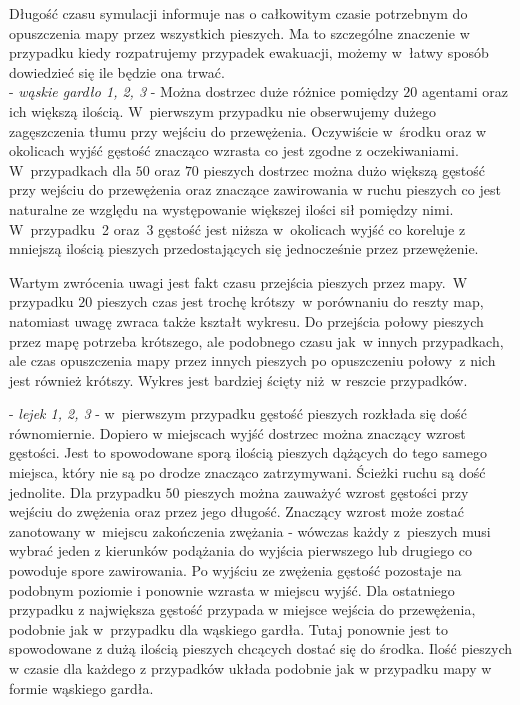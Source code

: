 Długość czasu symulacji informuje nas o całkowitym czasie potrzebnym do opuszczenia mapy przez wszystkich pieszych. Ma to szczególne znaczenie w przypadku kiedy rozpatrujemy przypadek ewakuacji, możemy w~łatwy sposób dowiedzieć się ile będzie ona trwać. \\

- \textit{wąskie gardło 1, 2, 3} - Można dostrzec duże różnice pomiędzy $20$ agentami oraz ich większą ilością. W~pierwszym przypadku nie obserwujemy dużego zagęszczenia tłumu przy wejściu do przewężenia. Oczywiście w~środku oraz w okolicach wyjść gęstość znacząco wzrasta co jest zgodne z oczekiwaniami. W~przypadkach dla $50$ oraz $70$ pieszych dostrzec można dużo większą gęstość przy wejściu do przewężenia oraz znaczące zawirowania w ruchu pieszych co jest naturalne ze względu na występowanie większej ilości sił pomiędzy nimi. W~przypadku~2 oraz~3 gęstość jest niższa w~okolicach wyjść co koreluje z mniejszą ilością pieszych przedostających się jednocześnie przez przewężenie.

Wartym zwrócenia uwagi jest fakt czasu przejścia pieszych przez mapy.~W przypadku $20$ pieszych czas jest trochę krótszy~w porównaniu do reszty map, natomiast uwagę zwraca także kształt wykresu. Do przejścia połowy pieszych przez mapę potrzeba krótszego, ale podobnego czasu jak~w innych przypadkach, ale czas opuszczenia mapy przez innych pieszych po opuszczeniu połowy~z nich jest również krótszy. Wykres jest bardziej ścięty niż~w reszcie przypadków.

- \textit{lejek 1, 2, 3} - w~pierwszym przypadku gęstość pieszych rozkłada się dość równomiernie. Dopiero w miejscach wyjść dostrzec można znaczący wzrost gęstości. Jest to spowodowane sporą ilością pieszych dążących do tego samego miejsca, który nie są po drodze znacząco zatrzymywani. Ścieżki ruchu są dość jednolite. Dla przypadku $50$ pieszych można zauważyć wzrost gęstości przy wejściu do zwężenia oraz przez jego długość. Znaczący wzrost może zostać zanotowany w~miejscu zakończenia zwężania - wówczas każdy z~pieszych musi wybrać jeden z kierunków podążania do wyjścia pierwszego lub drugiego co powoduje spore zawirowania. Po wyjściu ze zwężenia gęstość pozostaje na podobnym poziomie i ponownie wzrasta w miejscu wyjść. Dla ostatniego przypadku z największa gęstość przypada w miejsce wejścia do przewężenia, podobnie jak w~przypadku dla wąskiego gardła. Tutaj ponownie jest to spowodowane z dużą ilością pieszych chcących dostać się do środka. 
Ilość pieszych w czasie dla każdego z przypadków układa podobnie jak w przypadku mapy w formie wąskiego gardła.

